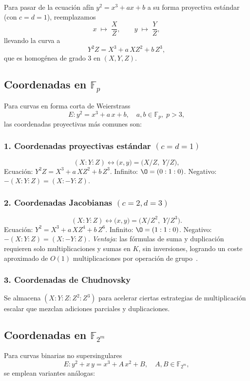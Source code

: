Para pasar de la ecuación afín \(y^2 = x^3 + ax + b\) a su forma proyectiva estándar (con \(c=d=1\)), reemplazamos
\[
  x\;\mapsto\;\frac{X}{Z},\qquad y\;\mapsto\;\frac{Y}{Z},
\]
llevando la curva a
\[
  Y^2Z = X^3 + a\,X Z^2 + b\,Z^3,
\]
que es homogénea de grado 3 en \((X,Y,Z)\).

\subsection{Coordenadas en \(\mathbb{F}_p\)}\label{sec:proj_Fp}
Para curvas en forma corta de Weierstrass
\[
  E\colon y^2 = x^3 + a\,x + b,\quad a,b\in\mathbb{F}_p,\;p>3,
\]
las coordenadas proyectivas más comunes son:
\subsubsection*{1. Coordenadas proyectivas estándar \((c=d=1)\)}
\[
  (X:Y:Z)\leftrightarrow\bigl(x,y\bigr)=\bigl(X/Z,\;Y/Z\bigr),
\]
\- Ecuación: \(Y^2Z = X^3 + a\,XZ^2 + b\,Z^3\).  
\- Infinito: \(\O=(0:1:0)\).  
\- Negativo: \(-(X:Y:Z)=(X:-Y:Z)\).

\subsubsection*{2. Coordenadas Jacobianas \((c=2,d=3)\)}
\[
  (X:Y:Z)\leftrightarrow\bigl(x,y\bigr)=\bigl(X/Z^2,\;Y/Z^3\bigr).
\]
\- Ecuación: \(Y^2 = X^3 + a\,X Z^4 + b\,Z^6\).  
\- Infinito: \(\O=(1:1:0)\).  
\- Negativo: \(-(X:Y:Z)=(X:-Y:Z)\).  
\- \emph{Ventaja}: las fórmulas de suma y duplicación requieren solo multiplicaciones y sumas en \(K\), sin inversiones, logrando un coste aproximado de \(O(1)\) multiplicaciones por operación de grupo~\cite{SilvermanAEC}.

\subsubsection*{3. Coordenadas de Chudnovsky}
Se almacena \((X:Y:Z:Z^2:Z^3)\) para acelerar ciertas estrategias de multiplicación escalar que mezclan adiciones parciales y duplicaciones.


\subsection{Coordenadas en \(\mathbb{F}_{2^m}\)}\label{sec:proj_F2m}
Para curvas binarias no supersingulares
\[
  E\colon y^2 + x\,y = x^3 + A\,x^2 + B,\quad A,B\in\mathbb{F}_{2^m},
\]
se emplean variantes análogas:

